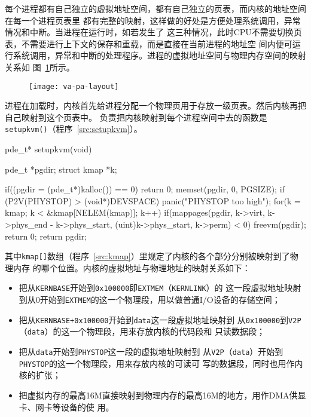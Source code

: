 \documentclass{swfuthesism}
\begin{document}
每个进程都有自己独立的虚拟地址空间，都有自己独立的页表，而内核的地址空间在每一个进程页表里
都有完整的映射，这样做的好处是方便处理系统调用，异常情况和中断。当进程在运行时，如若发生了
这三种情况，此时CPU不需要切换页表，不需要进行上下文的保存和重载，而是直接在当前进程的地址空
间内便可运行系统调用，异常和中断的处理程序。进程的虚拟地址空间与物理内存空间的映射关系如
图~\ref{fig:va-pa-layout}所示。

\begin{figure}[!ht]
  \centering
  \texttt{[image: va-pa-layout]}
  \label{fig:va-pa-layout}
\end{figure}

进程在加载时，内核首先给进程分配一个物理页用于存放一级页表。然后内核再把自己映射到这个页表中。
负责把内核映射到每个进程空间中去的函数是\texttt{setupkvm()}（程序~\ref{src:setupkvm}）。

\begin{listing}%
  \begin{codeblock}
\begin{ccode}
pde_t* setupkvm(void) {
  pde_t *pgdir;
  struct kmap *k;

  if((pgdir = (pde_t*)kalloc()) == 0)
    return 0;
  memset(pgdir, 0, PGSIZE);
  if (P2V(PHYSTOP) > (void*)DEVSPACE)
    panic("PHYSTOP too high");
  for(k = kmap; k < &kmap[NELEM(kmap)]; k++)
    if(mappages(pgdir, k->virt, k->phys_end - k->phys_start, (uint)k->phys_start, k->perm) < 0)    
    {    
      freevm(pgdir);
      return 0;
    }
  return pgdir;
}
\end{ccode}
  \end{codeblock}
  \label{src:setupkvm}
\end{listing}

其中\texttt{kmap[]}数组（程序~\ref{src:kmap}）里规定了内核的各个部分分别被映射到了物理内存
的哪个位置。内核的虚拟地址与物理地址的映射关系如下：
\begin{itemize}
\item 把从\texttt{KERNBASE}开始到\texttt{0x100000}即\texttt{EXTMEM}（\texttt{KERNLINK}）的
  这一段虚拟地址映射到从0开始到\texttt{EXTMEM}的这一个物理段，用以做普通I/O设备的存储空间；
\item 把从\texttt{KERNBASE+0x100000}开始到\texttt{data}这一段虚拟地址映射到
  从\texttt{0x100000}到\texttt{V2P}（\texttt{data}）的这一个物理段，用来存放内核的代码段和
  只读数据段；
\item 把从\texttt{data}开始到\texttt{PHYSTOP}这一段的虚拟地址映射到
  从\texttt{V2P}（\texttt{data}）开始到\texttt{PHYSTOP}的这一个物理段，用来存放内核的可读可
  写的数据段，同时也用作内核的扩张；
\item 把虚拟内存的最高16M直接映射到物理内存的最高16M的地方，用作DMA供显卡、网卡等设备的使
  用。
\end{itemize}
\end{document}
